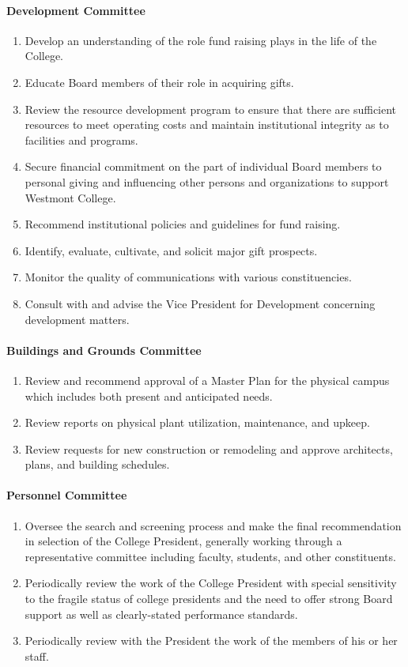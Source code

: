 \documentclass[letterpaper, 11pt]{article}
\begin{document}
			\paragraph{Development Committee}
				\begin{enumerate}[label=\alph*)]
					\item{Develop an understanding of the role fund raising plays in the life of the College.}
					\item{Educate Board members of their role in acquiring gifts.}
					\item{Review the resource development program to ensure that there are sufficient resources to meet operating costs and maintain institutional integrity as to facilities and programs.}
					\item{Secure financial commitment on the part of individual Board members to personal giving and influencing other persons and organizations to support Westmont College.}
					\item{Recommend institutional policies and guidelines for fund raising.}
					\item{Identify, evaluate, cultivate, and solicit major gift prospects.}
					\item{Monitor the quality of communications with various constituencies.}
					\item{Consult with and advise the Vice President for Development concerning development matters.}
				\end{enumerate}
			\paragraph{Buildings and Grounds Committee}
				\begin{enumerate}[label=\alph*)]
					\item{Review and recommend approval of a Master Plan for the physical campus which includes both present and anticipated needs.}
					\item{Review reports on physical plant utilization, maintenance, and upkeep.}
					\item{Review requests for new construction or remodeling and approve architects, plans, and building schedules.}
				\end{enumerate}
			\paragraph{Personnel Committee}
				\begin{enumerate}[label=\alph*)]
					\item{Oversee the search and screening process and make the final recommendation in selection of the College President, generally working through a representative committee including faculty, students, and other constituents.}
					\item{Periodically review the work of the College President with special sensitivity to the fragile status of college presidents and the need to offer strong Board support as well as clearly-stated performance standards.}
					\item{Periodically review with the President the work of the members of his or her staff.}
				\end{enumerate}
\end{document}
